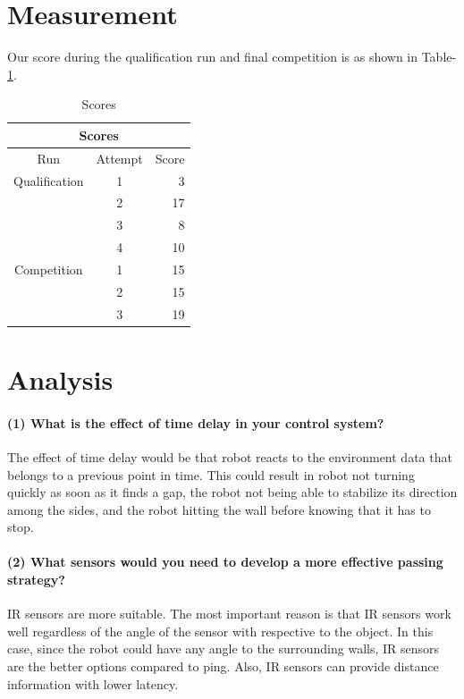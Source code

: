 \documentclass[a4paper]{article}
\begin{document}
\section{Measurement}
Our score during the qualification run and final competition is as shown in Table-\ref{tab1}.
\begin{table}
\center
  \begin{tabular}{|c|c|r|}
    \hline
    \multicolumn{3}{|c|}{Scores} \\
    \hline
     Run            & Attempt & Score \\
    \hline
     Qualification  & 1       & 3     \\
                    & 2       & 17    \\
                    & 3       & 8     \\
                    & 4       & 10    \\
    \hline                    
     Competition    & 1       & 15    \\
                    & 2       & 15    \\
                    & 3       & 19    \\                                                         
    \hline
  \end{tabular}
  \caption{Scores}
  \label{tab1}
\end{table}

\newpage
\section{Analysis}
\paragraph{(1) What is the effect of time delay in your control system? \\}
The effect of time delay would be that robot reacts to the environment data that belongs to a previous point in time.
This could result in robot not turning quickly as soon as it finds a gap, the robot not being able to stabilize its
direction among the sides, and the robot hitting the wall before knowing that it has to stop.

\paragraph{(2) What sensors would you need to develop a more effective passing strategy? \\}
IR sensors are more suitable. The most important reason is that IR sensors work well regardless of the angle of the sensor with respective to the object. In this case, since the robot could have any angle to the surrounding walls, IR sensors are the better options compared to ping. Also, IR sensors can provide distance information with lower latency.
\end{document}
